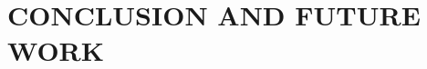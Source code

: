 \documentclass[a4paper,13pt,3p,twoside]{report}
\renewcommand{\bibname}{reference}
\theoremstyle{definition}
\begin{document}
\chapter{CONCLUSION AND FUTURE WORK} %
\label{chapter:conclusion}


\newpage
%


\newpage
\renewcommand\bibname{REFERENCE}
\printbibliography
{}
\end{document}
